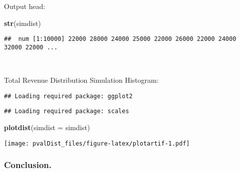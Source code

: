 \documentclass[]{article}
\newenvironment{Shaded}{\begin{snugshade}}{\end{snugshade}}
\newcommand{\DataTypeTok}[1]{\textcolor[rgb]{0.13,0.29,0.53}{#1}}
\newcommand{\DecValTok}[1]{\textcolor[rgb]{0.00,0.00,0.81}{#1}}
\newcommand{\KeywordTok}[1]{\textcolor[rgb]{0.13,0.29,0.53}{\textbf{#1}}}
\newcommand{\NormalTok}[1]{#1}
\newcommand{\OperatorTok}[1]{\textcolor[rgb]{0.81,0.36,0.00}{\textbf{#1}}}
\newcommand{\OtherTok}[1]{\textcolor[rgb]{0.56,0.35,0.01}{#1}}
\newcommand{\StringTok}[1]{\textcolor[rgb]{0.31,0.60,0.02}{#1}}
\begin{document}
\begin{Shaded}
\end{Shaded}

Output head:

\begin{Shaded}
\begin{Highlighting}[]
\KeywordTok{str}\NormalTok{(simdist)}
\end{Highlighting}
\end{Shaded}

\begin{verbatim}
##  num [1:10000] 22000 28000 24000 25000 22000 26000 22000 24000 32000 22000 ...
\end{verbatim}

~

Total Revenue Distribution Simulation Histogram:

\begin{verbatim}
## Loading required package: ggplot2
\end{verbatim}

\begin{verbatim}
## Loading required package: scales
\end{verbatim}

\begin{Shaded}
\begin{Highlighting}[]
\KeywordTok{plotdist}\NormalTok{(}\DataTypeTok{simdist =}\NormalTok{ simdist)}
\end{Highlighting}
\end{Shaded}

\texttt{[image: pvalDist\_files/figure-latex/plotartif-1.pdf]}

\hypertarget{conclusion.}{%
\subsubsection{Conclusion.}\label{conclusion.}}
\end{document}
